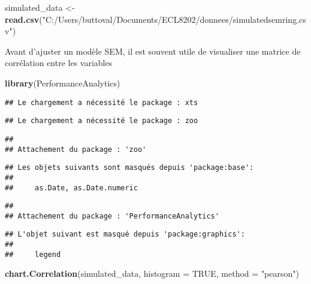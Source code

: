 \documentclass[
]{article}
\newenvironment{Shaded}{\begin{snugshade}}{\end{snugshade}}
\newcommand{\AttributeTok}[1]{\textcolor[rgb]{0.13,0.29,0.53}{#1}}
\newcommand{\ConstantTok}[1]{\textcolor[rgb]{0.56,0.35,0.01}{#1}}
\newcommand{\FunctionTok}[1]{\textcolor[rgb]{0.13,0.29,0.53}{\textbf{#1}}}
\newcommand{\NormalTok}[1]{#1}
\newcommand{\OtherTok}[1]{\textcolor[rgb]{0.56,0.35,0.01}{#1}}
\newcommand{\StringTok}[1]{\textcolor[rgb]{0.31,0.60,0.02}{#1}}
\begin{document}
\begin{Shaded}
\begin{Highlighting}[]
\NormalTok{simulated\_data }\OtherTok{\textless{}{-}} \FunctionTok{read.csv}\NormalTok{(}\StringTok{"C:/Users/buttoval/Documents/ECL8202/donnees/simulatedsemring.csv"}\NormalTok{)}
\end{Highlighting}
\end{Shaded}

Avant d'ajuster un modèle SEM, il est souvent utile de visualiser une
matrice de corrélation entre les variables

\begin{Shaded}
\begin{Highlighting}[]
\FunctionTok{library}\NormalTok{(PerformanceAnalytics)}
\end{Highlighting}
\end{Shaded}

\begin{verbatim}
## Le chargement a nécessité le package : xts
\end{verbatim}

\begin{verbatim}
## Le chargement a nécessité le package : zoo
\end{verbatim}

\begin{verbatim}
## 
## Attachement du package : 'zoo'
\end{verbatim}

\begin{verbatim}
## Les objets suivants sont masqués depuis 'package:base':
## 
##     as.Date, as.Date.numeric
\end{verbatim}

\begin{verbatim}
## 
## Attachement du package : 'PerformanceAnalytics'
\end{verbatim}

\begin{verbatim}
## L'objet suivant est masqué depuis 'package:graphics':
## 
##     legend
\end{verbatim}

\begin{Shaded}
\begin{Highlighting}[]
\FunctionTok{chart.Correlation}\NormalTok{(simulated\_data, }\AttributeTok{histogram =} \ConstantTok{TRUE}\NormalTok{, }\AttributeTok{method =} \StringTok{"pearson"}\NormalTok{)}
\end{Highlighting}
\end{Shaded}
\end{document}
